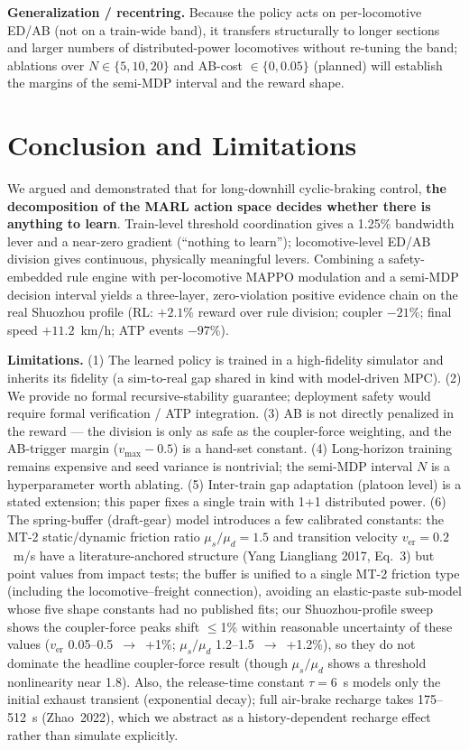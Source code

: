 \documentclass[conference]{IEEEtran}
\begin{document}
\textbf{Generalization / recentring.} Because the policy acts on
per-locomotive ED/AB (not on a train-wide band), it transfers structurally to
longer sections and larger numbers of distributed-power locomotives without
re-tuning the band; ablations over $N\in\{5,10,20\}$ and AB-cost
$\in\{0,0.05\}$ (planned) will establish the margins of the semi-MDP interval
and the reward shape.

\section{Conclusion and Limitations}
\label{sec:conclusion}

We argued and demonstrated that for long-downhill cyclic-braking control,
\textbf{the decomposition of the MARL action space decides whether there is
anything to learn}. Train-level threshold coordination gives a 1.25\%
bandwidth lever and a near-zero gradient (``nothing to learn'');
locomotive-level ED/AB division gives continuous, physically meaningful levers.
Combining a safety-embedded rule engine with per-locomotive MAPPO modulation
and a semi-MDP decision interval yields a three-layer, zero-violation positive
evidence chain on the real Shuozhou profile (RL: $+2.1\%$ reward over rule
division; coupler $-21\%$; final speed $+11.2$~km/h; ATP events $-97\%$).

\textbf{Limitations.}
(1) The learned policy is trained in a high-fidelity simulator and inherits its
fidelity (a sim-to-real gap shared in kind with model-driven MPC).
(2) We provide no formal recursive-stability guarantee; deployment safety would
require formal verification / ATP integration.
(3) AB is not directly penalized in the reward --- the division is only as safe
as the coupler-force weighting, and the AB-trigger margin
($v_{\max}-0.5$) is a hand-set constant.
(4) Long-horizon training remains expensive and seed variance is nontrivial;
the semi-MDP interval $N$ is a hyperparameter worth ablating.
(5) Inter-train gap adaptation (platoon level) is a stated extension; this
paper fixes a single train with 1+1 distributed power.
(6) The spring-buffer (draft-gear) model introduces a few calibrated constants:
the MT-2 static/dynamic friction ratio $\mu_s/\mu_d=1.5$ and transition velocity
$v_{\mathrm{er}}=0.2$~m/s have a literature-anchored structure (Yang Liangliang
2017, Eq.~3) but point values from impact tests; the buffer is unified to a
single MT-2 friction type (including the locomotive--freight connection),
avoiding an elastic-paste sub-model whose five shape constants had no published
fits;
our Shuozhou-profile sweep shows the coupler-force peaks shift $\le$1\%
within reasonable uncertainty of these values
($v_{\mathrm{er}}$ 0.05--0.5~$\to$~+1\%; $\mu_s/\mu_d$ 1.2--1.5~$\to$~+1.2\%),
so they do not dominate the headline coupler-force result (though $\mu_s/\mu_d$
shows a threshold nonlinearity near 1.8). Also, the release-time constant
$\tau=6$~s models only the initial exhaust transient (exponential decay); full
air-brake recharge takes 175--512~s (Zhao~2022), which we abstract as a
history-dependent recharge effect rather than simulate explicitly.
\end{document}
